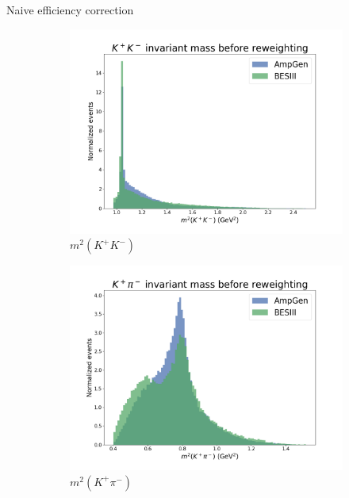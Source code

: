 \documentclass{beamer}
\begin{document}
\begin{frame}{Naive efficiency correction}
  \begin{figure}
    \begin{subfigure}{0.33\textwidth}
      \includegraphics[width = 1.0\textwidth]{Plots/s01_BeforeReweighting.png}
      \caption{$m^2(K^+K^-)$}
    \end{subfigure}%
    \begin{subfigure}{0.33\textwidth}
      \includegraphics[width = 1.0\textwidth]{Plots/s03_BeforeReweighting.png}
      \caption{$m^2(K^+\pi^-)$}
    \end{subfigure}%
    \begin{subfigure}{0.33\textwidth}

\end{subfigure}
\end{figure}
\end{frame}
\end{document}
